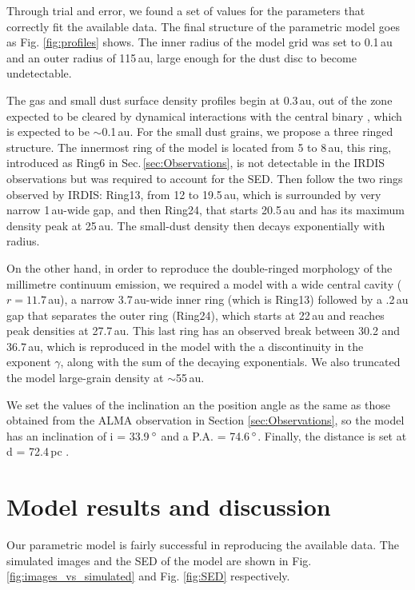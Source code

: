 \documentclass[letters,usenatbib,times]{mnras}
\begin{document}
Through trial and error, we found a set of values for the parameters that  correctly fit the available data. The final structure of the parametric model goes as Fig. \ref{fig:profiles} shows. The inner radius of the model grid was set to 0.1\,au and an outer radius of 115\,au, large enough for the dust disc to become undetectable.

The gas and small dust surface density profiles  begin at 0.3\,au, out of the zone expected to be cleared by dynamical interactions with the central binary \citep{Art_Lu}, which is expected to be $\sim$0.1\,au. For the small dust grains, we propose a three ringed structure. The innermost ring of the model is located from 5 to 8\,au, this ring, introduced as Ring6 in Sec.\,\ref{sec:Observations}, is not detectable in the IRDIS  observations but was required to account for the  SED. Then follow the two  rings observed by IRDIS:  Ring13, from 12 to 19.5\,au, which is surrounded by very narrow  1\,au-wide gap, and then Ring24, that starts  20.5\,au and has its maximum density peak at 25\,au. The small-dust density  then decays exponentially with  radius.


On the other hand, in order to reproduce the double-ringed  morphology of the millimetre continuum emission,  we required a model with   a wide central cavity ($r = 11.7$\,au), a narrow 3.7\,au-wide inner ring (which is Ring13) followed by a .2\,au gap  that separates the  outer ring (Ring24), which starts at  22\,au and reaches peak  densities  at 27.7\,au. This last ring has an observed break between 30.2 and 36.7\,au, which is reproduced in the model with the a discontinuity in the exponent $\gamma$, along with the sum of the decaying exponentials. We also truncated  the model large-grain density at  $\sim$55\,au. 


We set the values of the inclination an the position angle as the same as those obtained from the ALMA observation in Section \ref{sec:Observations}, so the model has an inclination of i = 33.9\,$\hbox{$^\circ$}$ and a P.A. = 74.6\,$\hbox{$^\circ$}$. Finally, the distance is set at d = 72.4\,pc \citep{Gaia}.

\section{Model results and discussion} \label{sec:results}

Our parametric model is fairly successful in reproducing the available data. The simulated images and the SED of the model are shown in Fig. \ref{fig:images_vs_simulated} and Fig. \ref{fig:SED} respectively.
\end{document}
